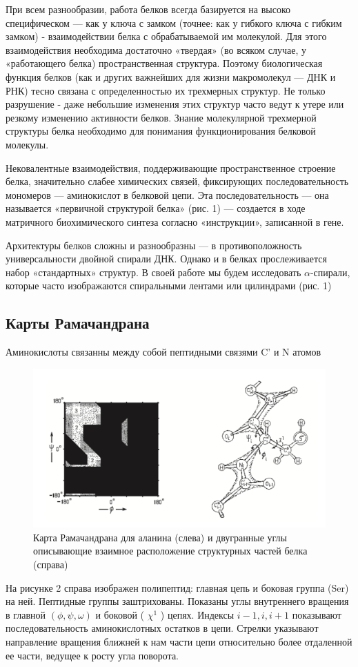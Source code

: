 \documentclass[
11pt,%
tightenlines,%
twoside,%
onecolumn,%
nofloats,%
nobibnotes,%
nofootinbib,%
superscriptaddress,%
noshowpacs,%
centertags]%
{revtex4}
\begin{document}
При всем разнообразии, работа белков всегда базируется на высоко специфическом — как у ключа с замком (точнее: как у гибкого ключа с гибким замком) - взаимодействии белка с обрабатываемой им молекулой. Для этого взаимодействия необходима достаточно «твердая» (во всяком случае, у «работающего белка) пространственная структура. Поэтому биологическая функция белков (как и других важнейших для жизни макромолекул — ДНК и РНК) тесно связана с определенностью их трехмерных структур. Не только разрушение - даже небольшие изменения этих структур часто ведут к утере или резкому изменению активности белков.
Знание молекулярной трехмерной структуры белка необходимо для понимания функционирования белковой молекулы. 

Нековалентные взаимодействия, поддерживающие пространственное строение белка, значительно слабее химических связей, фиксирующих последовательность мономеров — аминокислот в белковой цепи. Эта
последовательность — она называется «первичной структурой белка» (рис. 1) — создается в ходе матричного биохимического синтеза согласно «инструкции», записанной в гене.

Архитектуры белков сложны и разнообразны — в противоположность универсальности двойной спирали ДНК. Однако и в белках прослеживается набор «стандартных» структур.
В своей работе мы будем исследовать $\alpha$-спирали, которые часто изображаются спиральными лентами или цилиндрами (рис. 1)


\subsection{Карты Рамачандрана}

Аминокислоты связанны между собой пептидными связями C' и N атомов
\begin{figure}[h]
	\includegraphics[width=\textwidth]{map}
	\caption{Карта Рамачандрана для аланина (слева) и двугранные углы описывающие взаимное расположение структурных частей белка (справа)}
\end{figure}
На рисунке 2 справа изображен полипептид: главная цепь и боковая группа (Ser) на ней. Пептидные группы заштрихованы. Показаны углы внутреннего вращения в главной $(\phi, \psi, \omega)$ и боковой ( $\chi^1$ ) цепях. Индексы $i-1, i, i+1$ показывают последовательность аминокислотных остатков в цепи. Стрелки указывают направление вращения ближней к нам части цепи относительно более отдаленной ее части, ведущее к росту угла поворота. 
\end{document}
